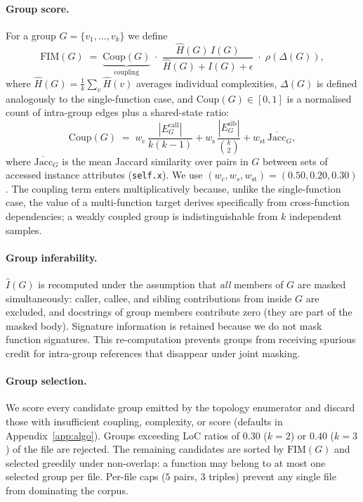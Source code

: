 \paragraph{Group score.}
For a group $G = \{v_1, \dots, v_k\}$ we define
%
\begin{equation}
  \mathrm{FIM}(G) \;=\;
  \underbrace{\mathrm{Coup}(G)}_{\text{coupling}}
  \;\cdot\;
  \frac{\hat{H}(G)\,\hat{I}(G)}{\hat{H}(G) + \hat{I}(G) + \epsilon}
  \;\cdot\;
  \rho\!\left(\Delta(G)\right),
  \label{eq:fim_group}
\end{equation}
%
where $\hat{H}(G) = \tfrac{1}{k}\sum_v \hat{H}(v)$ averages individual
complexities, $\Delta(G)$ is defined analogously to the single-function case,
and $\mathrm{Coup}(G) \in [0, 1]$ is a normalised count of intra-group
edges plus a shared-state ratio:
%
\begin{equation}
  \mathrm{Coup}(G)
  \;=\; w_{\mathrm{c}}\,\frac{|E^{\text{call}}_G|}{k(k\!-\!1)}
   + w_{\mathrm{s}}\,\frac{|E^{\text{sib}}_G|}{\binom{k}{2}}
   + w_{\mathrm{st}}\,\overline{\mathrm{Jacc}}_G,
\end{equation}
where $\overline{\mathrm{Jacc}}_G$ is the mean Jaccard similarity over
pairs in $G$ between sets of accessed instance attributes
(\texttt{self.x}). We use $(w_c, w_s, w_{\mathrm{st}}) = (0.50, 0.20, 0.30)$.
The coupling term enters multiplicatively because, unlike the
single-function case, the value of a multi-function target derives
specifically from cross-function dependencies; a weakly coupled group is
indistinguishable from $k$ independent samples.

\paragraph{Group inferability.}
$\hat{I}(G)$ is recomputed under the assumption that \emph{all} members of
$G$ are masked simultaneously: caller, callee, and sibling contributions
from inside $G$ are excluded, and docstrings of group members
contribute zero (they are part of the masked body). Signature information
is retained because we do not mask function signatures. This re-computation
prevents groups from receiving spurious credit for intra-group references
that disappear under joint masking.

\paragraph{Group selection.}
We score every candidate group emitted by the topology enumerator and
discard those with insufficient coupling, complexity, or score (defaults
in Appendix~\ref{app:algo}). Groups exceeding LoC ratios of
$0.30$ ($k=2$) or $0.40$ ($k=3$) of the file are rejected. The
remaining candidates are sorted by $\mathrm{FIM}(G)$ and selected greedily
under non-overlap: a function may belong to at most one selected group per
file. Per-file caps ($5$ pairs, $3$ triples) prevent any single file from
dominating the corpus.

